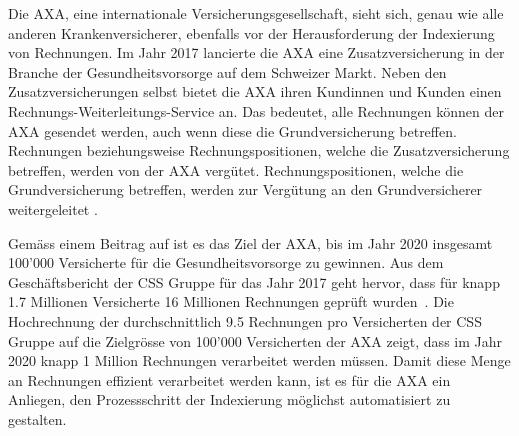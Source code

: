 


Die AXA, eine internationale Versicherungsgesellschaft, sieht sich, genau wie alle anderen Krankenversicherer, ebenfalls vor der Herausforderung der Indexierung von Rechnungen. Im Jahr 2017 lancierte die AXA eine Zusatzversicherung in der Branche der Gesundheitsvorsorge auf dem Schweizer Markt. Neben den Zusatzversicherungen selbst bietet die AXA ihren Kundinnen und Kunden einen Rechnungs-Weiterleitungs-Service an. Das bedeutet, alle Rechnungen können der AXA gesendet werden, auch wenn diese die Grundversicherung betreffen. Rechnungen beziehungsweise Rechnungspositionen, welche die Zusatzversicherung betreffen, werden von der AXA vergütet. Rechnungspositionen, welche die Grundversicherung betreffen, werden zur Vergütung an den Grundversicherer weitergeleitet \autocite{Finanzen.ch2017}.

Gemäss einem Beitrag auf \textcite{Finanzen.ch2017} ist es das Ziel der AXA, bis im Jahr 2020 insgesamt 100'000 Versicherte für die Gesundheitsvorsorge zu gewinnen. Aus dem Geschäftsbericht der CSS Gruppe für das Jahr 2017 geht hervor, dass für knapp 1.7 Millionen Versicherte 16 Millionen Rechnungen geprüft wurden~\autocite{CSSGruppe2018}. Die Hochrechnung der durchschnittlich 9.5 Rechnungen pro Versicherten der CSS Gruppe auf die Zielgrösse von 100'000 Versicherten der AXA zeigt, dass im Jahr 2020 knapp 1 Million Rechnungen verarbeitet werden müssen. Damit diese Menge an Rechnungen effizient verarbeitet werden kann, ist es für die AXA ein Anliegen, den Prozessschritt der Indexierung möglichst automatisiert zu gestalten.

